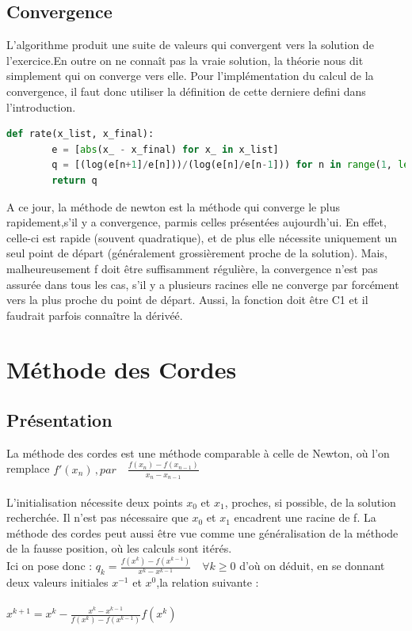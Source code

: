 \documentclass{article}
\begin{document}
\subsection{Convergence}
L'algorithme produit une suite de valeurs qui convergent vers la solution de l'exercice.En outre on ne connaît pas la vraie solution, la théorie nous dit simplement qui on converge vers elle.
Pour l'implémentation du calcul de la convergence, il faut donc utiliser la définition de cette derniere defini dans l'introduction. 
\begin{lstlisting}[language=Python, caption=Calcul de convergence en Python]
    def rate(x_list, x_final):
        e = [abs(x_ - x_final) for x_ in x_list]
        q = [(log(e[n+1]/e[n]))/(log(e[n]/e[n-1])) for n in range(1, len(e)-1, 1)]
        return q
\end{lstlisting}
A ce jour, la méthode de newton est la méthode qui converge le plus rapidement,s’il y a convergence, parmis celles présentées aujourdh'ui. En effet, celle-ci est rapide (souvent quadratique), et de plus elle nécessite uniquement un seul point de départ (généralement grossièrement proche de la solution).
Mais, malheureusement f doit être suffisamment régulière, la convergence n’est pas assurée dans tous les cas, s’il y a plusieurs racines elle ne converge par forcément vers la plus proche du point de départ. Aussi, la fonction doit être C1 et il faudrait parfois connaître la dérivéé.


\newpage
\section{Méthode des Cordes}
\subsection{Présentation} 
La méthode des cordes est une méthode comparable à celle de Newton, où l'on remplace ${\displaystyle f'(x_{n})\,}, par \quad  {\displaystyle {\frac {f(x_{n})-f(x_{n-1})}{x_{n}-x_{n-1}}}}$ \\ \\
L'initialisation nécessite deux points $x_0$ et $x_1$, proches, si possible, de la solution recherchée. Il n'est pas nécessaire que $x_0$ et $x_1$ encadrent une racine de f. La méthode des cordes peut aussi être vue comme une généralisation de la méthode de la fausse position, où les calculs sont itérés. \\
 Ici on pose donc : $q_k = \frac{f(x^k) - f(x^{k-1})}{x^k - x^{k-1}} \quad \forall k \geq 0 $
 d’où on déduit, en se donnant deux valeurs initiales $x^{−1}$ et $x^0$,la relation suivante : \\ \\
    $x^{k+1} = x^k - \frac{x^k - x^{k-1}}{ f(x^k)- f(x^{k-1}) }f(x^k)$
\end{document}
